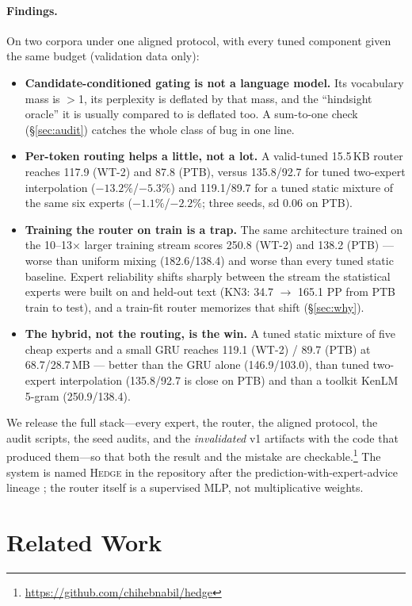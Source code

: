 \documentclass[11pt]{article}
\begin{document}
\paragraph{Findings.} On two corpora under one aligned protocol, with every
tuned component given the same budget (validation data only):
\begin{itemize}\itemsep0pt
\item \textbf{Candidate-conditioned gating is not a language model.} Its
  vocabulary mass is $>$1, its perplexity is deflated by that mass, and the
  ``hindsight oracle'' it is usually compared to is deflated too. A sum-to-one
  check (\S\ref{sec:audit}) catches the whole class of bug in one line.
\item \textbf{Per-token routing helps a little, not a lot.} A valid-tuned
  15.5\,KB router reaches 117.9 (WT-2) and 87.8 (PTB), versus 135.8/92.7 for
  tuned two-expert interpolation ($-13.2\%$/$-5.3\%$) and 119.1/89.7 for a
  tuned static mixture of the same six experts ($-1.1\%$/$-2.2\%$; three
  seeds, sd 0.06 on PTB).
\item \textbf{Training the router on train is a trap.} The same architecture
  trained on the 10--13$\times$ larger training stream scores 250.8 (WT-2) and
  138.2 (PTB) --- worse than uniform mixing (182.6/138.4) and worse than every
  tuned static baseline. Expert reliability shifts sharply between the stream the
  statistical experts were built on and held-out text (KN3: 34.7 $\rightarrow$
  165.1 PP from PTB train to test), and a train-fit router memorizes that
  shift (\S\ref{sec:why}).
\item \textbf{The hybrid, not the routing, is the win.} A tuned static mixture
  of five cheap experts and a small GRU reaches 119.1 (WT-2) / 89.7 (PTB) at
  68.7/28.7\,MB --- better than the GRU alone (146.9/103.0), than tuned
  two-expert interpolation (135.8/92.7 is close on PTB) and than a toolkit
  KenLM 5-gram (250.9/138.4).
\end{itemize}

We release the full stack---every expert, the router, the aligned protocol, the
audit scripts, the seed audits, and the \emph{invalidated} v1 artifacts with
the code that produced them---so that both the result and the mistake are
checkable.\footnote{\url{https://github.com/chihebnabil/hedge}} The system is
named \textsc{Hedge} in the repository after the prediction-with-expert-advice
lineage \cite{freund1997}; the router itself is a supervised MLP, not
multiplicative weights.

\section{Related Work}
\end{document}
